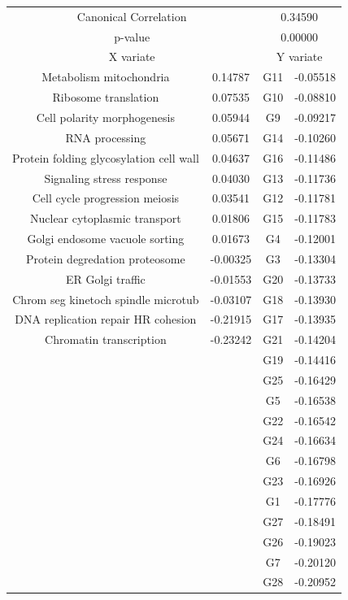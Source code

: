 \begin{figure}[H]
\centering
\begin{tabular}{ c c | c c }
  \multicolumn{2}{c}{Canonical Correlation} &  \multicolumn{2}{c}{0.34590} \\
  \multicolumn{2}{c}{p-value} &  \multicolumn{2}{c}{0.00000} \\
  \hline
  \multicolumn{2}{c}{X variate} & \multicolumn{2}{c}{Y variate}\\
  \hline
 Metabolism mitochondria & 0.14787 &  G11 & -0.05518\\
 Ribosome translation & 0.07535 &  G10 & -0.08810\\
 Cell polarity morphogenesis & 0.05944 &  G9 & -0.09217\\
 RNA processing & 0.05671 &  G14 & -0.10260\\
 Protein folding   glycosylation cell wall & 0.04637 &  G16 & -0.11486\\
 Signaling stress response & 0.04030 &  G13 & -0.11736\\
 Cell cycle progression meiosis & 0.03541 &  G12 & -0.11781\\
 Nuclear cytoplasmic transport & 0.01806 &  G15 & -0.11783\\
 Golgi endosome vacuole sorting & 0.01673 &  G4 & -0.12001\\
 Protein degredation proteosome & -0.00325 &  G3 & -0.13304\\
 ER Golgi traffic & -0.01553 &  G20 & -0.13733\\
 Chrom  seg  kinetoch  spindle microtub  & -0.03107 &  G18 & -0.13930\\
 DNA replication   repair HR cohesion & -0.21915 &  G17 & -0.13935\\
 Chromatin transcription & -0.23242 &  G21 & -0.14204\\
 & &  G19 & -0.14416\\
 & &  G25 & -0.16429\\
 & &  G5 & -0.16538\\
 & &  G22 & -0.16542\\
 & &  G24 & -0.16634\\
 & &  G6 & -0.16798\\
 & &  G23 & -0.16926\\
 & &  G1 & -0.17776\\
 & &  G27 & -0.18491\\
 & &  G26 & -0.19023\\
 & &  G7 & -0.20120\\
 & &  G28 & -0.20952\\

\end{tabular}
\end{figure}
